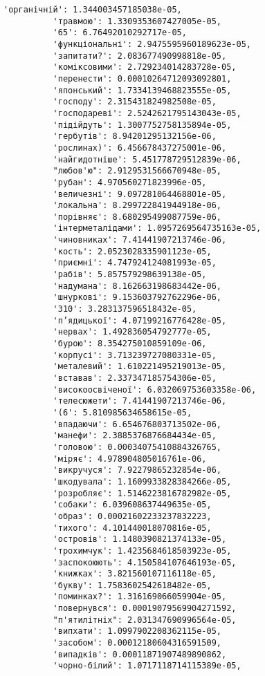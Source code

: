 \documentclass[11pt]{article}
\begin{document}
\begin{Verbatim}[commandchars=\\\{\}]
          'органічній': 1.344003457185038e-05,
          'травмою': 1.3309353607427005e-05,
          '65': 6.76492010292717e-05,
          'функціональні': 2.9475595960189623e-05,
          'запитати?': 2.083677490998818e-05,
          'коміксовими': 2.729234014283728e-05,
          'перенести': 0.00010264712093092801,
          'японський': 1.7334139468823555e-05,
          'господу': 2.315431824982508e-05,
          'господареві': 2.5242621795143043e-05,
          'підійдуть': 1.3007752758135894e-05,
          'гербутів': 8.94201295132156e-06,
          'рослинах)': 6.456678437275001e-06,
          'найгидотніше': 5.451778729512839e-06,
          "любов'ю": 2.9129531566670948e-05,
          'рубан': 4.970560271823996e-05,
          'величезні': 9.097281064468801e-05,
          'локальна': 8.299722841944918e-06,
          'порівняє': 8.680295499087759e-06,
          'інтерметалідами': 1.0957269564735163e-05,
          'чиновниках': 7.41441907213746e-06,
          'кость': 2.0523028335901123e-05,
          'приємні': 4.747924124081993e-05,
          'рабів': 5.857579298639138e-05,
          'надумана': 8.162663198683442e-06,
          'шнуркові': 9.153603792762296e-06,
          '310': 3.283137596518432e-05,
          'п’ядицької': 4.07199216776428e-05,
          'нервах': 1.492836054792777e-05,
          'бурою': 8.354275010859109e-06,
          'корпусі': 3.713239727080331e-05,
          'металевий': 1.610221495219013e-05,
          'вставав': 2.337347185754306e-05,
          'високоосвіченої': 6.032069753603358e-06,
          'телесюжети': 7.41441907213746e-06,
          '(6': 5.810985634658615e-05,
          'впадаючи': 6.654676803713502e-06,
          'манефи': 2.3885376876684434e-05,
          'головою': 0.00034075410884326765,
          'міряє': 4.978904805016761e-06,
          'викручуся': 7.92279865232854e-06,
          'шкодувала': 1.1609933828384266e-05,
          'розробляє': 1.5146223816782982e-05,
          'собаки': 6.039608637449635e-05,
          'образ': 0.00021602233237832223,
          'тихого': 4.101440018070816e-05,
          'островів': 1.1480390821374133e-05,
          'трохимчук': 1.4235684618503923e-05,
          'заспокоюють': 4.150584107646193e-05,
          'книжках': 3.821560107116118e-05,
          'букву': 1.7583602542618482e-05,
          'поминках?': 1.316169066059904e-05,
          'повернувся': 0.00019079569904271592,
          "п'ятилітніх": 2.031347690996564e-05,
          'випхати': 1.0997902208362115e-05,
          'засобом': 0.00012180604316591509,
          'випадків': 0.00011871907489890862,
          'чорно-білий': 1.0717118714115389e-05,

\end{Verbatim}
\end{document}
